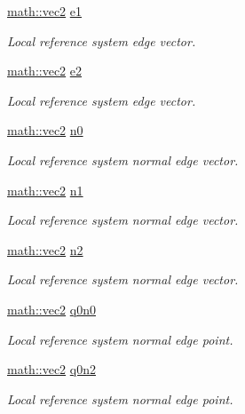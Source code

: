 \begin{DoxyCompactItemize}
\hyperlink{structphysim_1_1math_1_1vec2}{math\+::vec2} \hyperlink{classphysim_1_1geometric_1_1triangle_a729f755d23297af20de950d99552859a}{e1}
\begin{DoxyCompactList}\small\item\em Local reference system edge vector. \end{DoxyCompactList}\item 
\hyperlink{structphysim_1_1math_1_1vec2}{math\+::vec2} \hyperlink{classphysim_1_1geometric_1_1triangle_a9e2c598ece34f8df7f37558ab09c297c}{e2}
\begin{DoxyCompactList}\small\item\em Local reference system edge vector. \end{DoxyCompactList}\item 
\hyperlink{structphysim_1_1math_1_1vec2}{math\+::vec2} \hyperlink{classphysim_1_1geometric_1_1triangle_a90cd098fb3959fbc0c7ef29673991131}{n0}
\begin{DoxyCompactList}\small\item\em Local reference system normal edge vector. \end{DoxyCompactList}\item 
\hyperlink{structphysim_1_1math_1_1vec2}{math\+::vec2} \hyperlink{classphysim_1_1geometric_1_1triangle_a4280d8774bd8e283645b6251874c2bb2}{n1}
\begin{DoxyCompactList}\small\item\em Local reference system normal edge vector. \end{DoxyCompactList}\item 
\hyperlink{structphysim_1_1math_1_1vec2}{math\+::vec2} \hyperlink{classphysim_1_1geometric_1_1triangle_ae50e06030752185f79700b3a4b67e6de}{n2}
\begin{DoxyCompactList}\small\item\em Local reference system normal edge vector. \end{DoxyCompactList}\item 
\hyperlink{structphysim_1_1math_1_1vec2}{math\+::vec2} \hyperlink{classphysim_1_1geometric_1_1triangle_a8a3bf081df4faf1d5d47445f4d0f4e1d}{q0n0}
\begin{DoxyCompactList}\small\item\em Local reference system normal edge point. \end{DoxyCompactList}\item 
\hyperlink{structphysim_1_1math_1_1vec2}{math\+::vec2} \hyperlink{classphysim_1_1geometric_1_1triangle_aa88459c64286ba102c13e0aef731a711}{q0n2}
\begin{DoxyCompactList}\small\item\em Local reference system normal edge point. \end{DoxyCompactList}\item 

\end{DoxyCompactItemize}
